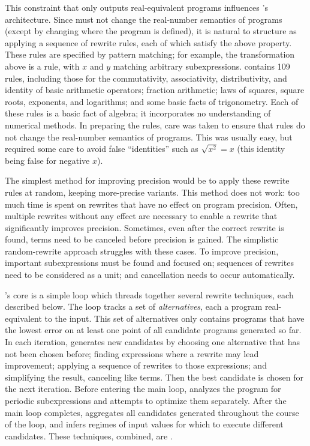 \documentclass[paper.tex]{subfiles}
\begin{document}
This constraint that \casio only outputs real-equivalent programs
  influences \casio's architecture.
Since \casio must not change the real-number semantics of programs
  (except by changing where the program is defined),
  it is natural to structure \casio
  as applying a sequence of rewrite rules,
  each of which satisfy the above property.
These rules are specified by pattern matching;
  for example, the transformation above is a rule,
  with $x$ and $y$ matching arbitrary subexpressions.
\casio contains 109 rules,
  including those for
  the commutativity, associativity, distributivity, and identity
  of basic arithmetic operators;
  fraction arithmetic;
  laws of squares, square roots, exponents, and logarithms;
  and some basic facts of trigonometry.
Each of these rules is a basic fact of algebra;
  it incorporates no understanding of numerical methods.
In preparing the rules,
  care was taken to ensure that rules
  do not change the real-number semantics of programs.
This was usually easy, but required some care
  to avoid false ``identities'' such as $\sqrt{x^2} = x$
  (this identity being false for negative $x$).

The simplest method for improving precision
  would be to apply these rewrite rules at random,
  keeping more-precise variants.
This method does not work:
  too much time is spent on rewrites
  that have no effect on program precision.
Often, multiple rewrites without any effect
  are necessary to enable a rewrite that significantly improves precision.
Sometimes, even after the correct rewrite is found,
  terms need to be canceled before precision is gained.
The simplistic random-rewrite approach struggles with these cases.
To improve precision, important subexpressions
  must be found and focused on;
  sequences of rewrites need to be considered as a unit;
  and cancellation needs to occur automatically.

\casio's core is a simple loop
  which threads together several rewrite techniques,
  each described below.
The loop tracks a set of \emph{alternatives},
  each a program real-equivalent to the input.
This set of alternatives only contains
  programs that have the lowest error on at least one point
  of all candidate programs generated so far.
In each iteration, \casio generates new candidates
  by choosing one alternative that has not been chosen before;
  finding expressions where a rewrite may lead improvement;
  applying a sequence of rewrites to those expressions;
  and simplifying the result, canceling like terms.
Then the best candidate is chosen for the next iteration.
Before entering the main loop,
  \casio analyzes the program for periodic subexpressions
  and attempts to optimize them separately.
After the main loop completes,
  \casio aggregates all candidates generated
  throughout the course of the loop,
  and infers regimes of input values for which
  to execute different candidates.
These techniques, combined, are \casio.
\end{document}
